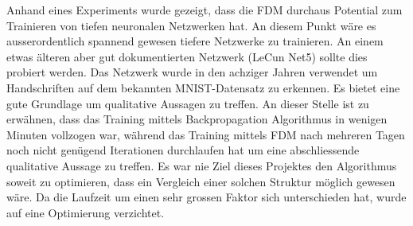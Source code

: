 Anhand eines Experiments wurde gezeigt, dass die FDM durchaus Potential zum Trainieren von tiefen neuronalen Netzwerken hat. An diesem Punkt wäre es ausserordentlich spannend gewesen tiefere Netzwerke zu trainieren. An einem etwas älteren aber gut dokumentierten Netzwerk (LeCun Net5) sollte dies probiert werden. Das Netzwerk wurde in den achziger Jahren verwendet um Handschriften auf dem bekannten MNIST-Datensatz zu erkennen. Es bietet eine gute Grundlage um qualitative Aussagen zu treffen. An dieser Stelle ist zu erwähnen, dass das Training mittels Backpropagation Algorithmus in wenigen Minuten vollzogen war, während das Training mittels FDM nach mehreren Tagen noch nicht genügend Iterationen durchlaufen hat um eine abschliessende qualitative Aussage zu treffen. Es war nie Ziel dieses Projektes den Algorithmus soweit zu optimieren, dass ein Vergleich einer solchen Struktur möglich gewesen wäre. Da die Laufzeit um einen sehr grossen Faktor sich unterschieden hat, wurde auf eine Optimierung verzichtet. 